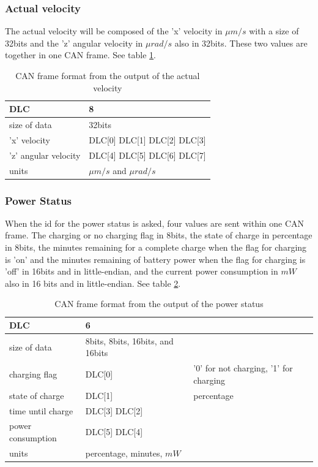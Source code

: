 \documentclass[12pt]{report}%
\begin{document}
\subsubsection{Actual velocity}
The actual velocity will be composed of the 'x' velocity in $\mu m/s$ with a size of 32bits and the 'z' angular velocity in $\mu rad/s$ also in 32bits. These two values are together in one CAN frame. See table \ref{tab:velocity}.

\begin{table}[h!]
\centering
\begin{tabular}{|l|l|}
	\hline
	DLC										&	8														\\	\hline
	size of data					&	32bits											\\	\hline
	'x' velocity					&	DLC[0] DLC[1] DLC[2] DLC[3]	\\	\hline
	'z'	angular velocity	&	DLC[4] DLC[5] DLC[6] DLC[7]	\\	\hline
	units									&	$\mu m/s$ and $\mu rad/s$		\\	\hline
\end{tabular}
\caption{\label{tab:velocity} CAN frame format from the output of the actual velocity}
\end{table}

\subsubsection{Power Status}
When the id for the power status is asked, four values are sent within one CAN frame. The charging or no charging flag in 8bits, the state of charge in percentage in 8bits, the minutes remaining for a complete charge when the flag for charging is 'on' and the minutes remaining of battery power when the flag for charging is 'off' in 16bits and in little-endian, and the current power consumption in $mW$ also in 16 bits and in little-endian. See table \ref{tab:powerstatus}.

\begin{table}[h!]
\centering
\begin{tabular}{|l|l|l|}
	\hline
	DLC										&	6																	&																					\\	\hline
	size of data					&	8bits, 8bits, 16bits, and 16bits	&																					\\	\hline
	charging flag					&	DLC[0]														& '0' for not charging, '1' for charging	\\	\hline
	state of charge				&	DLC[1] 														&	percentage															\\	\hline
	time until charge			&	DLC[3] DLC[2] 										&																					\\	\hline
	power consumption			&	DLC[5] DLC[4] 										&																					\\	\hline
	units									&	percentage, minutes, $mW$					&																					\\	\hline
\end{tabular}
\caption{\label{tab:powerstatus} CAN frame format from the output of the power status}
\end{table}
\end{document}
